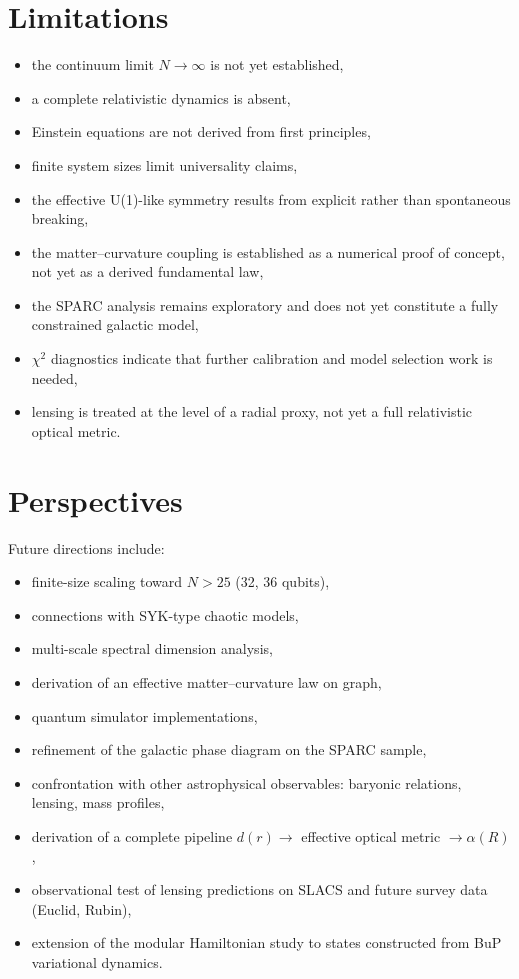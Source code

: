 \documentclass[11pt]{article}
\begin{document}
\section{Limitations}

\begin{itemize}
\item the continuum limit $N\rightarrow\infty$ is not yet established,
\item a complete relativistic dynamics is absent,
\item Einstein equations are not derived from first principles,
\item finite system sizes limit universality claims,
\item the effective U(1)-like symmetry results from explicit rather
      than spontaneous breaking,
\item the matter--curvature coupling is established as a numerical
      proof of concept, not yet as a derived fundamental law,
\item the SPARC analysis remains exploratory and does not yet
      constitute a fully constrained galactic model,
\item $\chi^2$ diagnostics indicate that further calibration and
      model selection work is needed,
\item lensing is treated at the level of a radial proxy, not yet
      a full relativistic optical metric.
\end{itemize}

\section{Perspectives}

Future directions include:

\begin{itemize}
\item finite-size scaling toward $N>25$ (32, 36 qubits),
\item connections with SYK-type chaotic models,
\item multi-scale spectral dimension analysis,
\item derivation of an effective matter--curvature law on graph,
\item quantum simulator implementations,
\item refinement of the galactic phase diagram on the SPARC sample,
\item confrontation with other astrophysical observables:
      baryonic relations, lensing, mass profiles,
\item derivation of a complete pipeline
      $d(r)\rightarrow$ effective optical metric $\rightarrow \alpha(R)$,
\item observational test of lensing predictions on SLACS and
      future survey data (Euclid, Rubin),
\item extension of the modular Hamiltonian study to states
      constructed from BuP variational dynamics.
\end{itemize}
\end{document}
